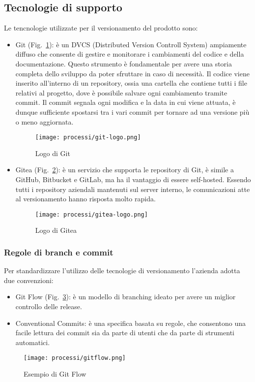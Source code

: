 \subsection{Tecnologie di supporto}
Le tencnologie utilizzate per il versionamento del prodotto sono:
\begin{itemize}
    \item Git (Fig.~\ref{fig:logo-git}): è un DVCS (Distributed Version Controll System) ampiamente diffuso che consente di gestire e monitorare i cambiamenti del codice e della documentazione. Questo strumento è fondamentale per avere una storia completa dello sviluppo da poter sfruttare in caso di necessità. Il codice viene inserito all'interno di un repository, ossia una cartella che contiene tutti i file relativi al progetto, dove è possibile salvare ogni cambiamento tramite commit. Il commit segnala ogni modifica e la data in cui viene attuata, è dunque sufficiente spostarsi tra i vari commit per tornare ad una versione più o meno aggiornata.  
    
    \begin{figure}[!h] 
        \centering 
        \texttt{[image: processi/git-logo.png]} 
        \caption{Logo di Git}
        \label{fig:logo-git}
      \end{figure}

    \item Gitea (Fig.~\ref{fig:logo-gitea}): è un servizio che supporta le repository di Git, è simile a GitHub, Bitbucket e GitLab, ma ha il vantaggio di essere self-hosted. 
    Essendo tutti i repository aziendali mantenuti sul server interno, le comunicazioni atte al versionamento hanno risposta molto rapida.

    \begin{figure}[!h] 
        \centering 
        \texttt{[image: processi/gitea-logo.png]} 
        \caption{Logo di Gitea}
        \label{fig:logo-gitea}
      \end{figure}
\end{itemize}

\newpage

\subsubsection{Regole di branch e commit}
Per standardizzare l'utilizzo delle tecnologie di versionamento l'azienda adotta due convenzioni:
\begin{itemize}
    \item Git Flow (Fig.~\ref{fig:schema-gitflow}): è un modello di branching ideato per avere un miglior controllo delle release.
    \item Conventional Commits: è una specifica basata su regole, che consentono una facile lettura dei commit sia da parte di utenti che da parte di strumenti automatici. 
\end{itemize}

\begin{figure}[!h] 
    \centering 
    \texttt{[image: processi/gitflow.png]} 
    \caption{Esempio di Git Flow }
    \label{fig:schema-gitflow}
  \end{figure}

  